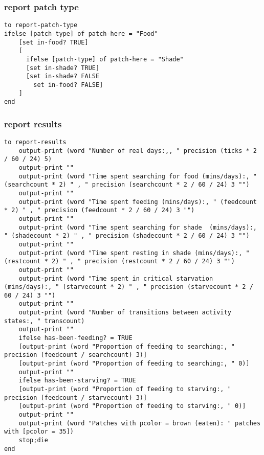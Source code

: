 \documentclass[]{article}
\begin{document}
\subsubsection{report patch type}\label{report-patch-type}

\begin{verbatim}
to report-patch-type
ifelse [patch-type] of patch-here = "Food"
    [set in-food? TRUE]
    [
      ifelse [patch-type] of patch-here = "Shade"
      [set in-shade? TRUE]
      [set in-shade? FALSE
        set in-food? FALSE]
    ]
end
\end{verbatim}

\subsubsection{report results}\label{report-results}

\begin{verbatim}
to report-results
    output-print (word "Number of real days:,, " precision (ticks * 2 / 60 / 24) 5)
    output-print ""
    output-print (word "Time spent searching for food (mins/days):, " (searchcount * 2) " , " precision (searchcount * 2 / 60 / 24) 3 "")
    output-print ""
    output-print (word "Time spent feeding (mins/days):, " (feedcount * 2) " , " precision (feedcount * 2 / 60 / 24) 3 "")
    output-print ""
    output-print (word "Time spent searching for shade  (mins/days):, " (shadecount * 2) " , " precision (shadecount * 2 / 60 / 24) 3 "")
    output-print ""
    output-print (word "Time spent resting in shade (mins/days):, " (restcount * 2) " , " precision (restcount * 2 / 60 / 24) 3 "")
    output-print ""
    output-print (word "Time spent in critical starvation (mins/days):, " (starvecount * 2) " , " precision (starvecount * 2 / 60 / 24) 3 "")
    output-print ""
    output-print (word "Number of transitions between activity states:, " transcount)
    output-print ""
    ifelse has-been-feeding? = TRUE
    [output-print (word "Proportion of feeding to searching:, " precision (feedcount / searchcount) 3)]
    [output-print (word "Proportion of feeding to searching:, " 0)]
    output-print ""
    ifelse has-been-starving? = TRUE
    [output-print (word "Proportion of feeding to starving:, " precision (feedcount / starvecount) 3)]
    [output-print (word "Proportion of feeding to starving:, " 0)]
    output-print ""
    output-print (word "Patches with pcolor = brown (eaten): " patches with [pcolor = 35])
    stop;die
end
\end{verbatim}
\end{document}
